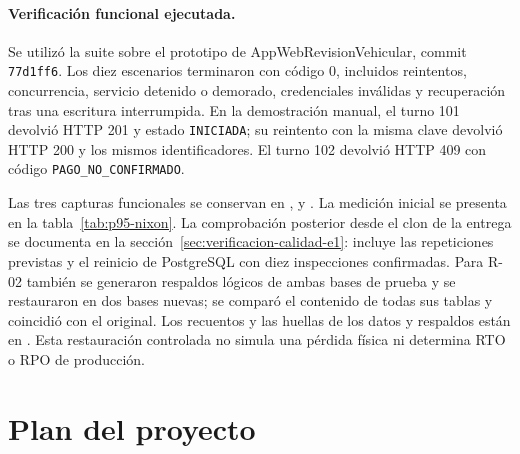 \documentclass[11pt,a4paper]{article}
\begin{document}
	\paragraph{Verificación funcional ejecutada.}
	Se utilizó la suite  sobre el prototipo de AppWebRevisionVehicular, commit \texttt{77d1ff6}. Los diez escenarios terminaron con código 0, incluidos reintentos, concurrencia, servicio detenido o demorado, credenciales inválidas y recuperación tras una escritura interrumpida. En la demostración manual, el turno 101 devolvió HTTP 201 y estado \texttt{INICIADA}; su reintento con la misma clave devolvió HTTP 200 y los mismos identificadores. El turno 102 devolvió HTTP 409 con código \texttt{PAGO\_NO\_CONFIRMADO}.
	
	{\raggedright Las tres capturas funcionales se conservan en ,  y . La medición inicial se presenta en la tabla~\ref{tab:p95-nixon}. La comprobación posterior desde el clon de la entrega se documenta en la sección~\ref{sec:verificacion-calidad-e1}: incluye las repeticiones previstas y el reinicio de PostgreSQL con diez inspecciones confirmadas. Para R-02 también se generaron respaldos lógicos de ambas bases de prueba y se restauraron en dos bases nuevas; se comparó el contenido de todas sus tablas y coincidió con el original. Los recuentos y las huellas de los datos y respaldos están en . Esta restauración controlada no simula una pérdida física ni determina RTO o RPO de producción.\par}
	
	\section{Plan del proyecto}
	
\end{document}
